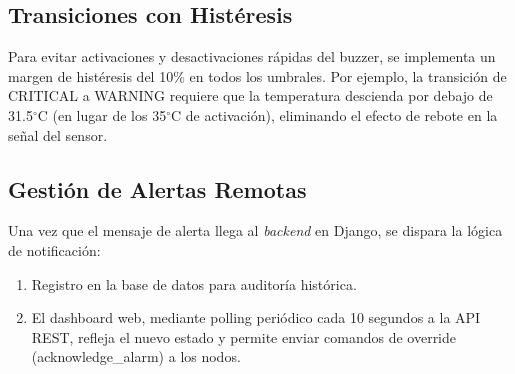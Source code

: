 \subsection{Transiciones con Hist\'eresis}
Para evitar activaciones y desactivaciones r\'apidas del buzzer, se implementa un margen de hist\'eresis del 10\% en todos los umbrales. Por ejemplo, la transici\'on de CRITICAL a WARNING requiere que la temperatura descienda por debajo de 31.5$^{\circ}$C (en lugar de los 35$^{\circ}$C de activaci\'on), eliminando el efecto de rebote en la se\~nal del sensor.

\subsection{Gesti\'on de Alertas Remotas}
Una vez que el mensaje de alerta llega al \textit{backend} en Django, se dispara la l\'ogica de notificaci\'on:
\begin{enumerate}
    \item Registro en la base de datos para auditor\'ia hist\'orica.
    \item El dashboard web, mediante polling peri\'odico cada 10 segundos a la API REST, refleja el nuevo estado y permite enviar comandos de override (acknowledge\_alarm) a los nodos.
\end{enumerate}
